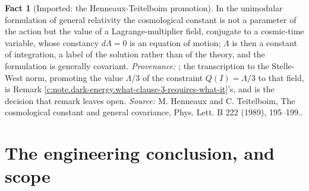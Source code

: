 \documentclass[11pt]{article}
\theoremstyle{definition}
\newtheorem{fact}[theorem]{Fact}
\theoremstyle{plain}
\newcommand{\changedmark}[2]{\marginpar{\raggedright\scriptsize\color{#1}#2}}
\begin{document}
\begin{fact}[Imported: the Henneaux-Teitelboim promotion]\label{c:dark-energy.imported-henneaux-teitelboim-promotion}
\changedmark{gray}{reworded}
In the unimodular formulation of general relativity the cosmological constant is not a parameter of the action but the value of a Lagrange-multiplier field, conjugate to a cosmic-time variable, whose constancy $d\Lambda = 0$ is an equation of motion; $\Lambda$ is then a constant of integration, a label of the solution rather than of the theory, and the formulation is generally covariant. \emph{Provenance:} \cite{HenneauxTeitelboim1989}; the transcription to the Stelle-West norm, promoting the value $\Lambda/3$ of the constraint $Q(I) = \Lambda/3$ to that field, is Remark \ref{c:note.dark-energy.what-clause-3-requires-what-it}'s, and is the decision that remark leaves open.
\emph{Source:} M. Henneaux and C. Teitelboim, The cosmological constant and general covariance, Phys. Lett. B 222 (1989), 195--199..
\end{fact}

\section{The engineering conclusion, and scope}
\end{document}
